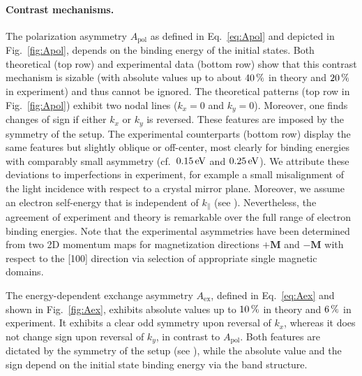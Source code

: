 \documentclass[prl,twocolumn,floatfix]{revtex4-2}
\renewcommand{\vec}[1]{\boldsymbol{#1}}
\begin{document}
\paragraph{Contrast mechanisms.} 
The polarization asymmetry $A_{\mathrm{pol}}$ as defined in Eq.~\eqref{eq:Apol} and depicted in Fig.~\ref{fig:Apol}, depends on the binding energy of the initial states. Both theoretical (top row) and experimental data (bottom row) show that this contrast mechanism is sizable (with absolute values up to about $\unit[40]{\%}$ in theory and $\unit[20]{\%}$ in experiment) and thus cannot be ignored. 
The theoretical patterns (top row in Fig.~\ref{fig:Apol}) exhibit two nodal lines ($k_{x} = 0$ and $k_{y} = 0$). Moreover, one finds changes of sign if either $k_{x}$ or $k_{y}$ is reversed. These features are imposed by the symmetry of the setup. The experimental counterparts (bottom row) display the same features but slightly oblique or off-center, most clearly for binding energies with comparably small asymmetry (cf.\ $\unit[0.15]{eV}$ and $\unit[0.25]{eV}$). We attribute these deviations to imperfections in experiment, for example a small misalignment of the light incidence with respect to a crystal mirror plane. Moreover, we assume an electron self-energy that is independent of $k_{\parallel}$ (see \cite{Supplement}). Nevertheless, the agreement of experiment and theory is remarkable over the full range of electron binding energies. Note that the experimental asymmetries have been determined from two 2D momentum maps for  magnetization directions $+\vec{M}$ and $-\vec{M}$ with respect to the [100] direction via selection of appropriate single magnetic domains.

The energy-dependent exchange asymmetry $A_{\mathrm{ex}}$, defined in Eq.~\eqref{eq:Aex} and shown in Fig.~\ref{fig:Aex}, exhibits absolute values up to $\unit[10]{\%}$ in theory and $\unit[6]{\%}$ in experiment. It exhibits a clear odd symmetry upon reversal of $k_{x}$, whereas it does not change sign upon reversal of $k_{y}$, in contrast to $A_{\mathrm{pol}}$. Both features are dictated by the symmetry of the setup (see \cite{Supplement}), while the absolute value and the sign depend on the initial state binding energy via the band structure.
\end{document}
